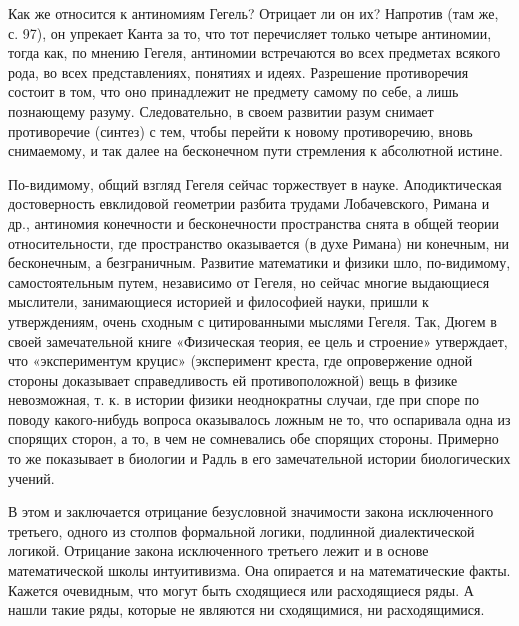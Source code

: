 Как же относится к антиномиям Гегель? Отрицает ли он их? Напротив (там
же, с. 97), он упрекает Канта за то, что тот перечисляет только четыре
антиномии, тогда как, по мнению  Гегеля, антиномии встречаются во всех
предметах  всякого рода,  во  всех представлениях,  понятиях и  идеях.
Разрешение противоречия состоит в том, что оно принадлежит не предмету
самому  по себе,  а  лишь познающему  разуму.  Следовательно, в  своем
развитии разум  снимает противоречие (синтез)  с тем, чтобы  перейти к
новому противоречию, вновь снимаемому, и так далее на бесконечном пути
стремления к абсолютной истине.

По-видимому,  общий   взгляд  Гегеля   сейчас  торжествует   в  науке.
Аподиктическая  достоверность  евклидовой  геометрии  разбита  трудами
Лобачевского,  Римана  и  др., антиномия  конечности  и  бесконечности
пространства снята  в общей  теории относительности,  где пространство
оказывается   (в  духе   Римана)  ни   конечным,  ни   бесконечным,  а
безграничным.   Развитие  математики   и   физики  шло,   по-видимому,
самостоятельным  путем,   независимо  от  Гегеля,  но   сейчас  многие
выдающиеся мыслители, занимающиеся историей и философией науки, пришли
к  утверждениям, очень  сходным с  цитированными мыслями  Гегеля. Так,
Дюгем  в  своей  замечательной   книге  «Физическая  теория,  ее  цель
и  строение»  утверждает,   что  «экспериментум  круцис»  (эксперимент
креста,  где  опровержение  одной  стороны  доказывает  справедливость
ей  противоположной)  вещь  в  физике невозможная,  т.  к.  в  истории
физики  неоднократны случаи,  где  при споре  по поводу  какого-нибудь
вопроса  оказывалось ложным  не то,  что оспаривала  одна из  спорящих
сторон,  а то,  в чем  не сомневались  обе спорящих  стороны. Примерно
то  же показывает  в  биологии  и Радль  в  его замечательной  истории
биологических учений.

В  этом   и  заключается   отрицание  безусловной   значимости  закона
исключенного третьего, одного из  столпов формальной логики, подлинной
диалектической логикой. Отрицание закона исключенного третьего лежит и
в  основе  математической  школы  интуитивизма.  Она  опирается  и  на
математические факты. Кажется очевидным, что могут быть сходящиеся или
расходящиеся  ряды.  А  нашли  такие  ряды,  которые  не  являются  ни
сходящимися, ни расходящимися.

